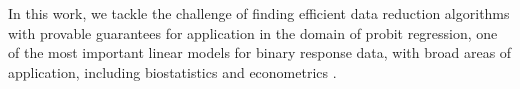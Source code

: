 In this work, we tackle the challenge of finding efficient
data reduction algorithms with provable guarantees for application
in the domain of probit regression, one of the most important
linear models for binary response data, with broad areas of
application, including biostatistics \cite{probit-biostatistics}
and econometrics \cite{probit-econometrics}.



\newpage